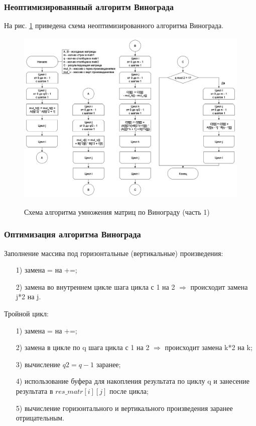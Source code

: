 \documentclass[a4paper,14pt]{article}
\begin{document}
    \subsubsection{Неоптимизированнный алгоритм Винограда}
    
        На рис. \ref{fig:schema_mult_v_1} приведена схема неоптимизированного алгоритма Винограда.
        
        
        
        \begin{figure}[h!]
        	\begin{center}
        		{\includegraphics[scale = 0.35]{winograd.png}}
        		\caption{Схема алгоритма умножения матриц по Винограду (часть 1)}
        		\label{fig:schema_mult_v_1}
        	\end{center}
        \end{figure}
        
        \subsubsection{Оптимизация алгоритма Винограда}
        		Заполнение массива под горизонтальные (вертикальные) произведения:
	\begin{enumerate} 
	\item[1)] замена = на +=;
	\item[2)] замена во внутреннем цикле шага цикла с 1 на 2 $\Rightarrow$ происходит замена j*2 на j.
	\end{enumerate}
	
	Тройной цикл:
	\begin{enumerate} 
	\item[1)] замена = на +=;
	\item[2)] замена в цикле по q шага цикла с 1 на 2 $\Rightarrow$ происходит замена k*2 на k;
	\item[3)] вычисление $q2 = q - 1$ заранее;
	\item[4)] использование буфера для накопления результата по циклу q и занесение результата в $res\_matr[i][j]$ после цикла;
	\item[5)] вычисление горизонтального и вертикального произведения заранее отрицательным.

	\end{enumerate}
	
\end{document}
